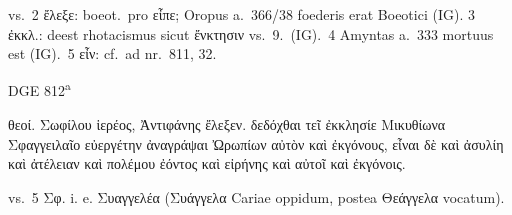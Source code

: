 vs.\ 2 \textgreek{ἔλεξε}: boeot.\ pro \textgreek{εἶπε}; Oropus a.\ 366/38
foederis erat Boeotici (IG). 3 \textgreek{ἐκκλ}.: deest rhotacismus sicut
\textgreek{ἔνκτησιν} vs.\ 9.\ (IG).\ 4 Amyntas a.\ 333 mortuus est (IG).\ 5
\textgreek{εἶν}: cf.\ ad nr.\ 811, 32.

\begin{versi}{DGE 812\textsuperscript{a}}
  \begin{greek}
    θεοί. {\verso[1]} Σωφίλου ἱερέος, {\verso} Ἀντιφάνης ἔλεξεν. {\verso}
    δεδόχθαι τεῖ ἐκκλησίε Μικυθίωνα Σφαγγειλαῖο
    {\verso} εὐεργέτην ἀναγράψαι {\verso} Ὠρωπίων αὐτὸν καὶ
    ἐκγό{\verso}νους, εἶναι δὲ καὶ ἀσυλίη {\verso} καὶ ἀτέλειαν
    καὶ πολέμου ἐόντος καὶ εἰρήνης {\verso} καὶ αὐτοῖ καὶ ἐκγόνοις.
  \end{greek}
\end{versi}

vs.\ 5 \textgreek{Σφ}. i. e. \textgreek{Συαγγελέα} (\textgreek{Συάγγελα}
Cariae oppidum, postea \textgreek{Θεάγγελα} vocatum).